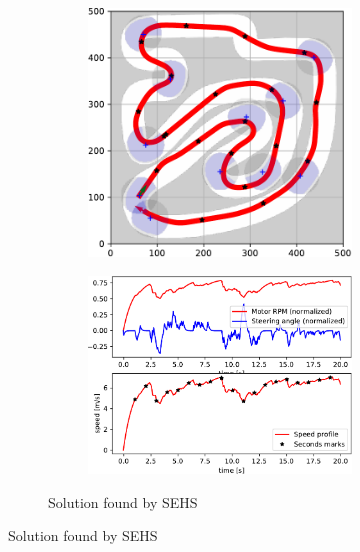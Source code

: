 \begin{figure}[!tbp]
	\vspace{0.75cm}
	
	\begin{subfigure}[t]{\textwidth}	
		\begin{subfigure}[c]{0.54\textwidth}
			\includegraphics[width=\textwidth]{../img/experiments/zurich-sehs-trajectory}
		\end{subfigure}
		\hfill
		\begin{subfigure}[c]{0.45\textwidth}
			\includegraphics[width=\textwidth]{../img/experiments/zurich-sehs-actuators}
		\end{subfigure}
		\caption{Solution found by SEHS}
		\label{fig:zurich-sehs}
	\end{subfigure}


\end{figure}
